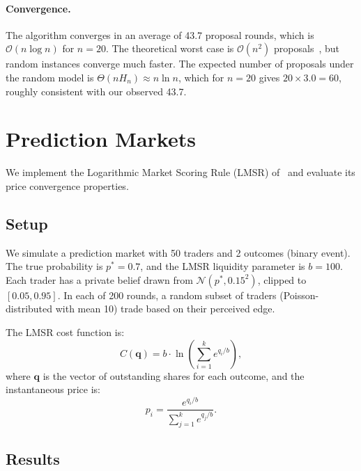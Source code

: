\documentclass[10pt]{article}
\begin{document}
\paragraph{Convergence.}
The algorithm converges in an average of 43.7 proposal rounds, which is $\mathcal{O}(n \log n)$ for $n=20$. The theoretical worst case is $\mathcal{O}(n^2)$ proposals~\citep{knuth1976mariages}, but random instances converge much faster. The expected number of proposals under the random model is $\Theta(n H_n) \approx n \ln n$, which for $n=20$ gives $20 \times 3.0 = 60$, roughly consistent with our observed 43.7.

\section{Prediction Markets}
\label{sec:prediction}

We implement the Logarithmic Market Scoring Rule (LMSR) of~\citet{hanson2003combinatorial} and evaluate its price convergence properties.

\subsection{Setup}

We simulate a prediction market with 50 traders and 2 outcomes (binary event). The true probability is $p^* = 0.7$, and the LMSR liquidity parameter is $b = 100$. Each trader has a private belief drawn from $\mathcal{N}(p^*, 0.15^2)$, clipped to $[0.05, 0.95]$. In each of 200 rounds, a random subset of traders (Poisson-distributed with mean 10) trade based on their perceived edge.

The LMSR cost function is:
\begin{equation}
C(\mathbf{q}) = b \cdot \ln\!\left(\sum_{i=1}^{k} e^{q_i / b}\right),
\end{equation}
where $\mathbf{q}$ is the vector of outstanding shares for each outcome, and the instantaneous price is:
\begin{equation}
p_i = \frac{e^{q_i / b}}{\sum_{j=1}^{k} e^{q_j / b}}.
\end{equation}

\subsection{Results}
\end{document}
